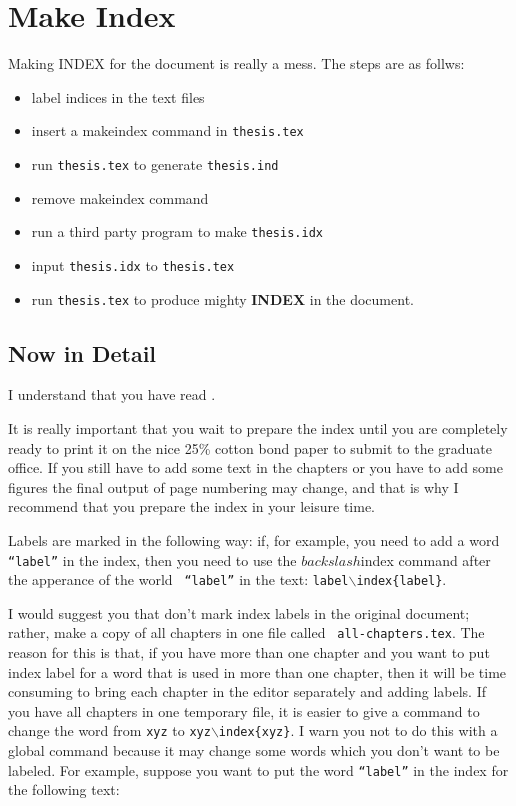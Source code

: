 
\chapter{Make Index}
\label{make-index}

Making INDEX for the document is really a mess. The steps
are as follws:

\begin {itemize}
   \item label indices in the text files
   \item insert a makeindex command in {\tt thesis.tex}
   \item run {\tt thesis.tex} to generate {\tt thesis.ind}
   \item remove makeindex command
   \item run a third party program to make {\tt thesis.idx}
   \item input {\tt thesis.idx} to {\tt thesis.tex}
   \item run {\tt thesis.tex} to produce mighty {\bf INDEX} in the document.
\end{itemize}
\section{Now in Detail}

I understand that you have read \cite[pp:77--79]{lamport86}.

It is really important that you wait to prepare the index
until you are completely ready to print it on the nice 25\% cotton
bond paper to submit to the graduate office. If you still have to add
some text in the chapters or you have to add some figures the final
output of page numbering may change, and that is why I recommend that
you prepare the index in your leisure time.

Labels are marked in the following way: if, for example, you need to
add a word {\tt ``label''} in the index, then you need to
use the $backslash$index command after the apperance of the world {\tt
``label''} in the text: {\tt label$\backslash$index\{label\}}.

I would suggest you that don't mark index labels in the original
document; rather, make a copy of all chapters in one file called {\tt
all-chapters.tex}. The reason for this is that, if you have more than
one chapter and you want to put index label for a word that is used in
more than one chapter, then it will be time consuming to bring each
chapter in the editor separately and adding labels. If you have all
chapters in one temporary file, it is easier to give a command to
change the word from {\tt xyz} to {\tt xyz$\backslash$index\{xyz\}}. I
warn you not to do this with a global command because it may change
some words which you don't want to be labeled. For example, suppose
you want to put the word {\tt ``label''} in the index for
the following text:

